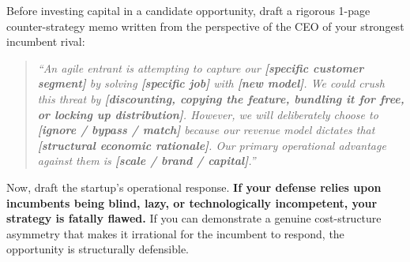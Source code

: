 Before investing capital in a candidate opportunity, draft a rigorous 1-page counter-strategy memo written from the perspective of the CEO of your strongest incumbent rival:

\begin{quote}
\itshape
``An agile entrant is attempting to capture our \textbf{[specific customer segment]} by solving \textbf{[specific job]} with \textbf{[new model]}. We could crush this threat by \textbf{[discounting, copying the feature, bundling it for free, or locking up distribution]}. However, we will deliberately choose to \textbf{[ignore / bypass / match]} because our revenue model dictates that \textbf{[structural economic rationale]}. Our primary operational advantage against them is \textbf{[scale / brand / capital]}.''
\end{quote}

Now, draft the startup's operational response. \textbf{If your defense relies upon incumbents being blind, lazy, or technologically incompetent, your strategy is fatally flawed.} If you can demonstrate a genuine cost-structure asymmetry that makes it irrational for the incumbent to respond, the opportunity is structurally defensible.
